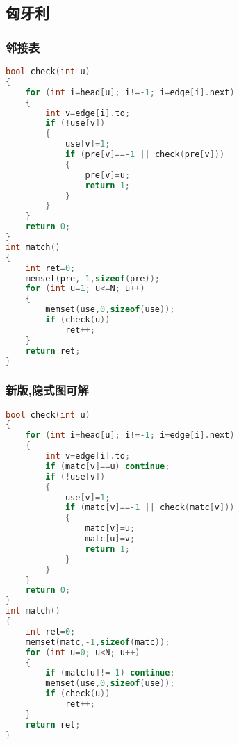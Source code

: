 \subsection{匈牙利} 
	
	\subsubsection{邻接表}
	\begin{lstlisting}[language=c++]
bool check(int u)
{
	for (int i=head[u]; i!=-1; i=edge[i].next)
	{
		int v=edge[i].to;
		if (!use[v])
		{
			use[v]=1;
			if (pre[v]==-1 || check(pre[v]))
			{
				pre[v]=u;
				return 1;
			}
		}
	}
	return 0;
}
int match()
{
	int ret=0;
	memset(pre,-1,sizeof(pre));
	for (int u=1; u<=N; u++)
	{
		memset(use,0,sizeof(use));
		if (check(u))
			ret++;
	}
	return ret;
}
	\end{lstlisting}

	\subsubsection{新版,隐式图可解}
	\begin{lstlisting}[language=c++]
bool check(int u)
{
	for (int i=head[u]; i!=-1; i=edge[i].next)
	{
		int v=edge[i].to;
		if (matc[v]==u) continue;
		if (!use[v])
		{
			use[v]=1;
			if (matc[v]==-1 || check(matc[v]))
			{
				matc[v]=u;
				matc[u]=v;
				return 1;
			}
		}
	}
	return 0;
}
int match()
{
	int ret=0;
	memset(matc,-1,sizeof(matc));
	for (int u=0; u<N; u++)
	{
		if (matc[u]!=-1) continue;
		memset(use,0,sizeof(use));
		if (check(u))
			ret++;
	}
	return ret;
}
	\end{lstlisting}
	
